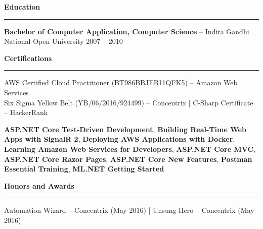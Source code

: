 \documentclass[10pt,a4paper]{article}
\newcommand{\sectionheader}[1]{%
    \vspace{8pt}
    {\large\bfseries #1}
    \vspace{2pt}
    \hrule
    \vspace{4pt}
}
\begin{document}
\sectionheader{Education}

\textbf{Bachelor of Computer Application, Computer Science} -- Indira Gandhi National Open University \hfill 2007 -- 2010


\sectionheader{Certifications}

AWS Certified Cloud Practitioner (BT986BBJEB11QFK5) -- Amazon Web Services\\
Six Sigma Yellow Belt (YB/06/2016/924499) -- Concentrix | C-Sharp Certificate -- HackerRank

\textbf{ASP.NET Core Test-Driven Development}, \textbf{Building Real-Time Web Apps with SignalR 2}, \textbf{Deploying AWS Applications with Docker}, \textbf{Learning Amazon Web Services for Developers}, \textbf{ASP.NET Core MVC}, \textbf{ASP.NET Core Razor Pages}, \textbf{ASP.NET Core New Features}, \textbf{Postman Essential Training}, \textbf{ML.NET Getting Started}


\sectionheader{Honors and Awards}

Automation Wizard -- Concentrix (May 2016) | Unsung Hero -- Concentrix (May 2016)
\end{document}
